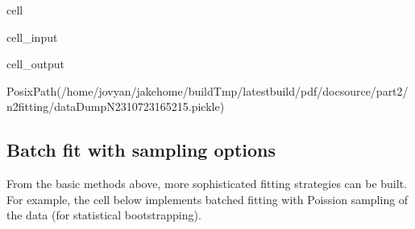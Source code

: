 \documentclass[letterpaper,table,10pt,english]{jupyterBook}
\begin{document}
\begin{sphinxuseclass}{cell}\begin{sphinxVerbatimInput}

\begin{sphinxuseclass}{cell_input}
\begin{sphinxVerbatim}[commandchars=\\\{\}]
    


     
\end{sphinxVerbatim}

\end{sphinxuseclass}\end{sphinxVerbatimInput}
\begin{sphinxVerbatimOutput}

\begin{sphinxuseclass}{cell_output}
\begin{sphinxVerbatim}[commandchars=\\\{\}]
PosixPath(\PYGZsq{}/home/jovyan/jake\PYGZhy{}home/buildTmp/\PYGZus{}latest\PYGZus{}build/pdf/doc\PYGZhy{}source/part2/n2fitting/dataDump\PYGZus{}N2\PYGZus{}310723\PYGZus{}16\PYGZhy{}52\PYGZhy{}15.pickle\PYGZsq{})
\end{sphinxVerbatim}

\end{sphinxuseclass}\end{sphinxVerbatimOutput}

\end{sphinxuseclass}

\subsection{Batch fit with sampling options}
\label{\detokenize{part2/basic_fitting_numerics_intro_260723:batch-fit-with-sampling-options}}
\sphinxAtStartPar
From the basic methods above, more sophisticated fitting strategies can be built. For example, the cell below implements batched fitting with Poission sampling of the data (for statistical bootstrapping).
\end{document}
